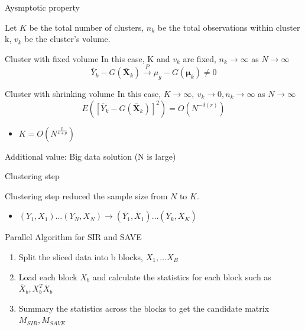 \documentclass[ignorenonframetext,]{beamer}
\providecommand{\tightlist}{%
  \setlength{\itemsep}{0pt}\setlength{\parskip}{0pt}}
\begin{document}
\begin{frame}{Aysmptotic property}

Let \(K\) be the total number of clusters, \(n_k\) be the total
observations within cluster k, \(v_k\) be the cluster's volume.

\begin{block}{Cluster with fixed volume}
In this case, K and $v_k$ are fixed, $n_k \to \infty$ as $N \to \infty$
\[
\bar{Y}_k - G(\bar{\mathbf X}_k) \stackrel{P}{\longrightarrow} \mu_g - G(\boldsymbol{\mu}_k)  \neq 0
\]
\end{block}

\begin{block}{Cluster with shrinking volume}
In this case, $K \to \infty,~v_k \to 0, n_k \to \infty $ as $N \to \infty$
\[
E([\bar{Y}_k - G(\bar{\mathbf X}_k)]^2) = O(N^{-\delta(r)})
\]
\end{block}

\begin{itemize}
\tightlist
\item
  \(K = O(N^\frac{p}{4+p})\)
\end{itemize}

\end{frame}

\begin{frame}{Additional value: Big data solution (N is large)}

\begin{block}{Clustering step}

Clustering step reduced the sample size from \(N\) to \(K\).

\begin{itemize}
\tightlist
\item
  \((Y_1,X_1) \dots (Y_N,X_N) \to (\bar{Y}_1,\bar{X}_1) \dots (\bar{Y}_k,\bar{X}_K)\)
\end{itemize}

\end{block}

\begin{block}{Parallel Algorithm for SIR and SAVE}

\begin{enumerate}
\def\labelenumi{\arabic{enumi}.}
\tightlist
\item
  Split the sliced data into b blocks, \(X_1, \dots X_B\)\\
\item
  Load each block \(X_b\) and calculate the statistics for each block
  such as \(\bar{X}_b, X^T_{b}X_{b}\)\\
\item
  Summary the statistics across the blocks to get the candidate matrix
  \(M_{SIR}, M_{SAVE}\)
\end{enumerate}

\end{block}

\end{frame}
\end{document}

